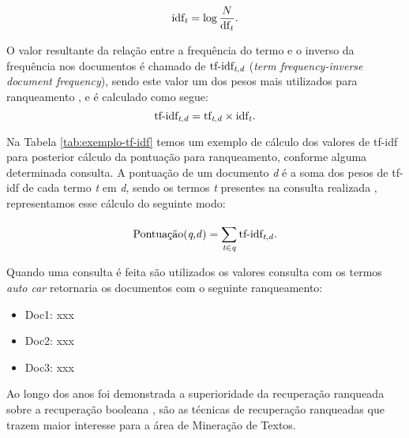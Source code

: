 \begin{equation}
    \text{idf}_{\text{\textit{t}}} = \log{\frac{N}{\text{df}_{\text{\textit{t}}}}}.
\end{equation}

O valor resultante da relação entre a frequência do termo e o inverso da frequência nos documentos é chamado de $\text{tf-idf}_{\text{\textit{t},\textit{d}}}$ (\textit{term frequency-inverse document frequency}), sendo este valor um dos pesos mais utilizados para ranqueamento \cite[p.~107--110]{Manning2008IIR}, e é calculado  como segue:
\begin{equation}
    \text{tf-idf}_{\text{\textit{t},\textit{d}}}  = \text{tf}_{\text{\textit{t},\textit{d}}} \times \text{idf}_{\text{\textit{t}}}.
\end{equation}



Na Tabela \ref{tab:exemplo-tf-idf} temos um exemplo de cálculo dos valores de tf-idf para posterior cálculo da pontuação para ranqueamento, conforme alguma determinada consulta. 
A pontuação de um documento \textit{d} é a soma dos pesos de tf-idf de cada termo \textit{t} em \textit{d}, sendo os termos \textit{t} presentes na consulta realizada \cite[p.~109]{Manning2008IIR}, representamos esse cálculo do seguinte modo:

\begin{equation}
    \text{Pontuação(\textit{q},\textit{d})} = \sum_{\textit{t} \in \textit{q}}^{} \text{tf-idf}_{\text{\textit{t},\textit{d}}}.
\end{equation}

Quando uma consulta é feita são utilizados os valores consulta com os termos \textit{auto car} retornaria os documentos com o seguinte ranqueamento:
\begin{itemize}
    \item Doc1: xxx
    \item Doc2: xxx
    \item Doc3: xxx
\end{itemize}

Ao longo dos anos foi demonstrada a superioridade da recuperação ranqueada sobre a recuperação booleana \cite{Jones:1981:IRE:539571}, são as técnicas de recuperação ranqueadas que trazem maior interesse para a área de Mineração de Textos.


